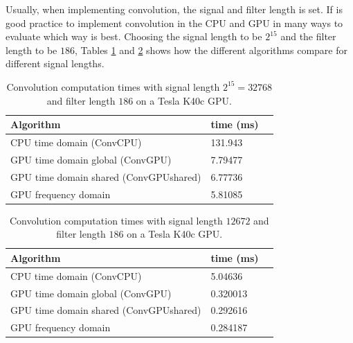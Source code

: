 Usually, when implementing convolution, the signal and filter length is set.
If is good practice to implement convolution in the CPU and GPU in many ways to evaluate which way is best.
Choosing the signal length to be $2^{15}$ and the filter length to be $186$, Tables \ref{tab:CPUvsGPUtable_2_15} and \ref{tab:CPUvsGPUtable_12672} shows how the different algorithms compare for different signal lengths.
\begin{table}
\caption{Convolution computation times with signal length $2^{15} = 32768$ and filter length $186$ on a Tesla K40c GPU.}
\begin{center}
\begin{tabular}{lll}
	\toprule
	Algorithm 								& time (ms) \\ \midrule
	CPU time domain (ConvCPU) 				& 131.943 	\\
	GPU time domain global (ConvGPU) 		& 7.79477	\\
	GPU time domain shared (ConvGPUshared) 	& 6.77736	\\
	GPU frequency domain		 			& 5.81085	\\ 
	\bottomrule
\end{tabular}
\end{center}
\label{tab:CPUvsGPUtable_2_15}
\end{table}
\begin{table}
\caption{Convolution computation times with signal length $12672$ and filter length $186$ on a Tesla K40c GPU.}
\begin{center}
\begin{tabular}{lll}
	\toprule
	Algorithm 								& time (ms) \\ \midrule
	CPU time domain (ConvCPU) 				& 5.04636 	\\
	GPU time domain global (ConvGPU) 		& 0.320013	\\
	GPU time domain shared (ConvGPUshared) 	& 0.292616	\\
	GPU frequency domain		 			& 0.284187	\\ 
	\bottomrule
\end{tabular}
\end{center}
\label{tab:CPUvsGPUtable_12672}
\end{table}

